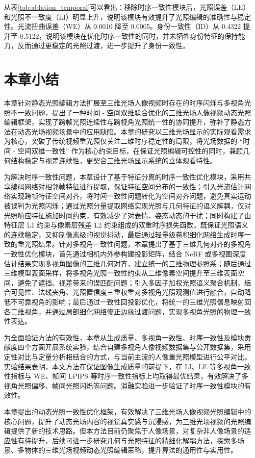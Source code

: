 从表\ref{tab:ablation_temporal}可以看出：移除时序一致性模块后，光照误差（LE）和光照不一致度（LI）明显上升，说明该模块有效提升了光照编辑的准确性与稳定性。光流扭曲误差（WE）从 0.0010 降至 0.0005。身份一致性（ID）从 0.4322 提升至 0.5122，说明该模块在优化时序一致性的同时，并未牺牲身份特征的保持能力，反而通过更稳定的光照过渡，进一步提升了身份一致性。



\section{本章小结}
本章针对静态光照编辑方法扩展至三维光场人像视频时存在的时序闪烁与多视角光照不一致问题，提出了一种时间 - 空间双维联合优化的三维光场人像视频动态光照编辑框架，实现了跨帧光照连续性与跨视角光照统一性的协同提升，弥补了静态方法在动态光场视频场景中的应用缺陷。本章的研究以三维光场显示的实际观看需求为核心，突破了传统视频重光照仅关注二维时序稳定性的局限，将光场数据的 “时间 - 空间双维一致性” 作为核心约束目标，在保证光照编辑可控性的同时，兼顾几何结构稳定与视差连续性，更契合三维光场显示系统的立体观看特性。

为解决时序一致性问题，本章设计了基于特征分离的时序一致性优化模块，采用共享编码网络对相邻帧特征进行提取，保证特征空间分布的一致性；引入光流估计网络实现跨帧特征空间对齐，将时间一致性问题转化为空间对齐问题，避免真实运动被误判为光照闪烁；通过光照分量提取网络实现光照与几何特征的语义解耦，仅对光照响应特征施加时间约束，有效减少了对表情、姿态动态的干扰；同时构建了由特征层 L1 约束与像素层残差 L2 约束组成的双重时序损失函数，既保证光照语义的连续稳定，又抑制像素级的视觉抖动，最后通过轻量级卷积细化网络生成时序一致的重光照结果。针对多视角一致性问题，本章提出了基于三维几何对齐的多视角一致性优化模块，首先通过相机内外参构建投影矩阵，结合 NeRF 或多视图深度估计结果实现多视角图像的三维几何对齐，建立统一的三维物理参照系；随后通过三维模型表面采样，将多视角光照一致性约束从二维像素空间提升至三维表面空间，避免了遮挡、视差带来的误匹配问题；引入多因子加权光照语义聚合机制，结合可见性、法线夹角、光照置信度三重权重对多视角光照观测值进行融合，自动降低不可靠视角的影响；最后通过一致性回投影优化，将统一的三维光照信息映射回各二维视角，并通过局部细化网络修正边缘过渡问题，实现多视角光照的物理一致性表达。

为全面验证方法的有效性，本章从生成质量、多视角一致性、时序一致性及模块贡献度四个方面开展系统实验，结合自建多视角人像视频数据集与公开数据集，采用定性对比与定量分析相结合的方式，与当前主流的人像重光照模型进行公平对比。实验结果表明，本文方法在保证图像生成质量的前提下，在 LI、LE 等多视角一致性指标与 WE、帧间 LPIPS 等时序一致性指标上均取得最优结果，有效解决了多视角光照偏移、帧间光照闪烁等问题。消融实验进一步验证了时序一致性模块的有效性。

本章提出的动态光照一致性优化框架，有效解决了三维光场人像视频光照编辑中的核心问题，提升了动态光场内容的视觉真实感与沉浸感，为三维光场视频的光照编辑提供了新的技术思路。但本方法目前仍聚焦于人像场景，对复杂非人像场景的适应性有待提升，后续可进一步研究几何与光照特征的精细化解耦方法，探索多场景、多物体的三维光场视频动态光照编辑策略，提升算法的通用性与实用性。



